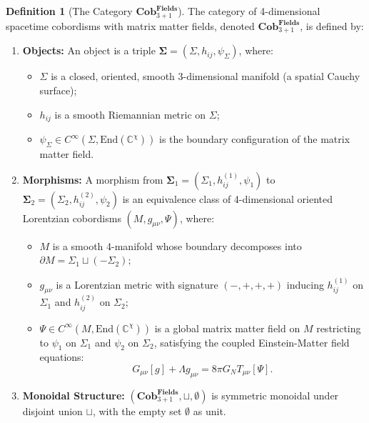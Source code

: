 \documentclass[11pt,a4paper,reqno]{amsart}
\theoremstyle{definition}
\newtheorem{definition}[theorem]{Definition}
\numberwithin{equation}{section}
\newcommand{\Cob}{\mathbf{Cob}_{3+1}^{\mathbf{Fields}}}
\begin{document}
\begin{definition}[The Category $\Cob$]
The category of 4-dimensional spacetime cobordisms with matrix matter fields, denoted $\Cob$, is defined by:
\begin{enumerate}[label=(\alph*)]
    \item \textbf{Objects:} An object is a triple $\mathbf{\Sigma} = (\Sigma, h_{ij}, \psi_\Sigma)$, where:
    \begin{itemize}
        \item $\Sigma$ is a closed, oriented, smooth 3-dimensional manifold (a spatial Cauchy surface);
        \item $h_{ij}$ is a smooth Riemannian metric on $\Sigma$;
        \item $\psi_\Sigma \in C^\infty(\Sigma, \mathrm{End}(\mathbb{C}^\chi))$ is the boundary configuration of the matrix matter field.
    \end{itemize}
    \item \textbf{Morphisms:} A morphism from $\mathbf{\Sigma}_1 = (\Sigma_1, h_{ij}^{(1)}, \psi_1)$ to $\mathbf{\Sigma}_2 = (\Sigma_2, h_{ij}^{(2)}, \psi_2)$ is an equivalence class of 4-dimensional oriented Lorentzian cobordisms $(M, g_{\mu\nu}, \Psi)$, where:
    \begin{itemize}
        \item $M$ is a smooth 4-manifold whose boundary decomposes into $\partial M = \Sigma_1 \sqcup (-\Sigma_2)$;
        \item $g_{\mu\nu}$ is a Lorentzian metric with signature $(-, +, +, +)$ inducing $h_{ij}^{(1)}$ on $\Sigma_1$ and $h_{ij}^{(2)}$ on $\Sigma_2$;
        \item $\Psi \in C^\infty(M, \mathrm{End}(\mathbb{C}^\chi))$ is a global matrix matter field on $M$ restricting to $\psi_1$ on $\Sigma_1$ and $\psi_2$ on $\Sigma_2$, satisfying the coupled Einstein-Matter field equations:
        \begin{equation}
            G_{\mu\nu}[g] + \Lambda g_{\mu\nu} = 8\pi G_N T_{\mu\nu}[\Psi].
        \end{equation}
    \end{itemize}
    \item \textbf{Monoidal Structure:} $(\Cob, \sqcup, \emptyset)$ is symmetric monoidal under disjoint union $\sqcup$, with the empty set $\emptyset$ as unit.
\end{enumerate}
\end{definition}

\end{document}
